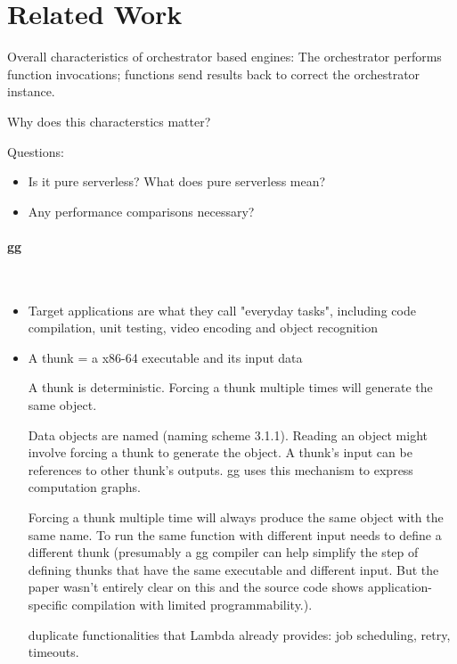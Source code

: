 \section{Related Work}\label{sec:related}

Overall characteristics of orchestrator based engines: The orchestrator
performs function invocations; functions send results back to correct the
orchestrator instance.

Why does this characterstics matter?

Questions:

\begin{itemize}
	\item Is it pure serverless? What does pure serverless mean?
	\item Any performance comparisons necessary?
\end{itemize}

\paragraph{gg}~\cite{gg-atc}

\begin{itemize}
	\item Target applications are what they call "everyday tasks", including code compilation, unit testing, video encoding and object recognition
	\item A thunk = a x86-64 executable and its input data

	A thunk is deterministic. Forcing a thunk multiple times will generate the same object.

	Data objects are named (naming scheme 3.1.1). Reading an object might involve forcing a thunk to generate the object. A thunk's input can be references to other thunk's outputs. gg uses this mechanism to express computation graphs.

	Forcing a thunk multiple time will always produce the same object with the same name. To run the same function with different input needs to define a different thunk (presumably a gg compiler can help simplify the step of defining thunks that have the same executable and different input. But the paper wasn't entirely clear on this and the source code shows application-specific compilation with limited programmability.).


	duplicate functionalities that Lambda already provides: job scheduling, retry, timeouts.



\end{itemize}


